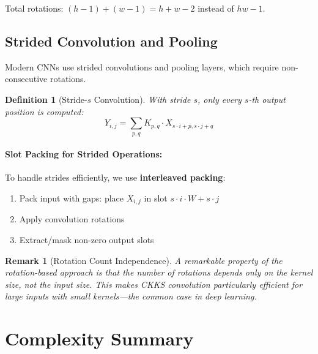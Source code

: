 \documentclass[11pt,a4paper]{article}
\newtheorem{definition}{Definition}
\newtheorem{remark}{Remark}
\begin{document}
Total rotations: $(h - 1) + (w - 1) = h + w - 2$ instead of $hw - 1$.

\subsection{Strided Convolution and Pooling}

Modern CNNs use strided convolutions and pooling layers, which require non-consecutive rotations.

\begin{definition}[Stride-$s$ Convolution]
With stride $s$, only every $s$-th output position is computed:
\[
Y_{i,j} = \sum_{p,q} K_{p,q} \cdot X_{s \cdot i + p, s \cdot j + q}
\]
\end{definition}

\paragraph{Slot Packing for Strided Operations:}

To handle strides efficiently, we use \textbf{interleaved packing}:
\begin{enumerate}
    \item Pack input with gaps: place $X_{i,j}$ in slot $s \cdot i \cdot W + s \cdot j$
    \item Apply convolution rotations
    \item Extract/mask non-zero output slots
\end{enumerate}

\begin{remark}[Rotation Count Independence]
A remarkable property of the rotation-based approach is that the number of rotations depends only on the kernel size, not the input size. This makes CKKS convolution particularly efficient for large inputs with small kernels—the common case in deep learning.
\end{remark}

\section{Complexity Summary}
\end{document}
